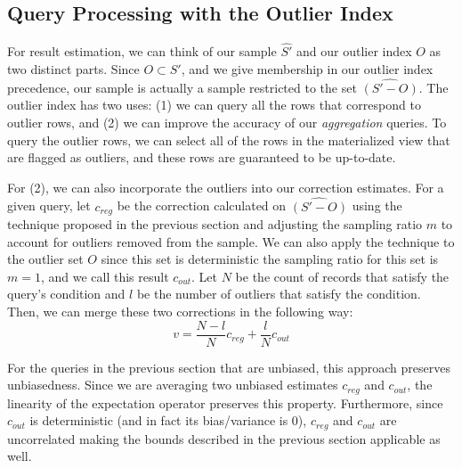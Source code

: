 \subsection{Query Processing with the Outlier Index} 
For result estimation, we can think of our sample $\hat{S'}$ and our outlier index $O$ as two distinct parts.
Since $O \subset S'$, and we give membership in our outlier index precedence, our sample is actually a sample restricted to the set $\widehat{(S'-O)}$. 
The outlier index has two uses: (1) we can query all the rows that correspond to outlier rows, 
and (2) we can improve the accuracy of our \emph{aggregation} queries.
To query the outlier rows, we can select all of the rows in the materialized view that are flagged as outliers, and these rows are guaranteed to be up-to-date.

For (2), we can also incorporate the outliers into our correction estimates.  
For a given query, let $c_{reg}$ be the correction calculated on $\widehat{(S'-O)}$ using the technique proposed in the previous section and adjusting the sampling ratio $m$ to account for outliers removed from the sample.
We can also apply the technique to the outlier set $O$ since this set is deterministic the sampling ratio for this set is $m=1$, and we call this result $c_{out}$.
Let $N$ be the count of records that satisfy the query's condition and $l$ be the number of outliers that satisfy the condition.
Then, we can merge these two corrections in the following way:
\[
 v = \frac{N-l}{N}c_{reg} + \frac{l}{N}c_{out}
\]

For the queries in the previous section that are unbiased, this approach preserves unbiasedness.
Since we are averaging two unbiased estimates $c_{reg}$ and $c_{out}$, the linearity of the expectation operator preserves this property.
Furthermore, since $c_{out}$ is deterministic (and in fact its bias/variance is 0), $c_{reg}$ and $c_{out}$ are uncorrelated making the bounds described in the previous section applicable as well.

